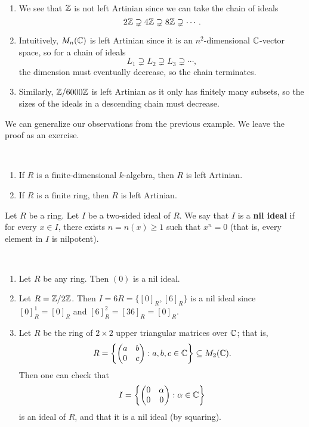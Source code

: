 \begin{exmp}~
\begin{enumerate}[(1)]
    \item We see that $\mathbb{Z}$ is not left Artinian since we can take the chain of ideals 
    \[ 2\mathbb{Z} \supsetneq 4\mathbb{Z} \supsetneq 8\mathbb{Z} \supsetneq \cdots. \]
    \item Intuitively, $M_n(\mathbb{C})$ is left Artinian since it is an $n^2$-dimensional $\mathbb{C}$-vector space, so
    for a chain of ideals
    \[ L_1 \supsetneq L_2 \supsetneq L_3 \supsetneq \cdots, \]
    the dimension must eventually decrease, so the chain terminates.
    \item Similarly, $\mathbb{Z}/6000\mathbb{Z}$ is left Artinian as it only has finitely many subsets, so the 
    sizes of the ideals in a descending chain must decrease. 
\end{enumerate}
\end{exmp}

We can generalize our observations from the previous example. We leave the proof as an exercise.

\begin{remark}~
\begin{enumerate}[(1)]
    \item If $R$ is a finite-dimensional $k$-algebra, then $R$ is left Artinian.
    \item If $R$ is a finite ring, then $R$ is left Artinian.
\end{enumerate}
\end{remark}

\begin{defn}
Let $R$ be a ring. Let $I$ be a two-sided ideal of $R$. We say that $I$ is a {\bf nil ideal} 
if for every $x \in I$,  there exists $n = n(x) \geq 1$ such that $x^n = 0$ (that is, 
every element in $I$ is nilpotent). 
\end{defn}

\begin{exmp}~
\begin{enumerate}[(1)]
    \item Let $R$ be any ring. Then $(0)$ is a nil ideal. 
    \item Let $R = \mathbb{Z}/2\mathbb{Z}$. Then $I = 6R = \{[0]_R, [6]_R\}$ is a nil ideal since 
    $[0]_R^1 = [0]_R$ and $[6]_R^2 = [36]_R = [0]_R$. 
    \item Let $R$ be the ring of $2 \times 2$ upper triangular matrices over $\mathbb{C}$; that is, 
    \[ R = \left\{ \begin{pmatrix} a&b\\0&c \end{pmatrix} : a, b,c \in \mathbb{C} \right\} \subseteq M_2(\mathbb{C}). \]
    Then one can check that 
    \[ I = \left\{ \begin{pmatrix} 0&\alpha\\0&0 \end{pmatrix} : \alpha \in \mathbb{C} \right\} \]
    is an ideal of $R$, and that it is a nil ideal (by squaring). 
\end{enumerate}
\end{exmp}

